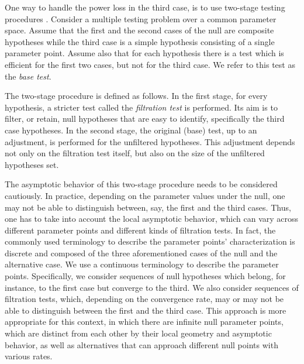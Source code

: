 \documentclass[ejs, twoside]{imsart}
\theoremstyle{plain}
\theoremstyle{remark}
\numberwithin{equation}{section}
\numberwithin{table}{section}
\numberwithin{figure}{section}
\begin{document}

One way to handle the power loss in the third case, is to use two-stage testing procedures \citep{ignatiadis_data-driven_2016, djordjilovic_optimal_2020}. Consider a multiple testing problem over a common parameter space. Assume that the first and the second cases of the null are composite hypotheses while the third case is a simple hypothesis consisting of a single parameter point. Assume also that for each hypothesis there is a test which is efficient for the first two cases, but not for the third case. We refer to this test as the \emph{base test}. %

The two-stage procedure is defined as follows. In the first stage, for every hypothesis, a stricter test called the \emph{filtration test} is performed. Its aim is to filter, or retain, null hypotheses that are easy to identify, specifically the third case hypotheses. %
In the second stage, the original (base) test, up to an adjustment, is performed for the unfiltered hypotheses.
This adjustment depends not only on the filtration test itself, but also on the size of the unfiltered hypotheses set.

The asymptotic behavior of this two-stage procedure needs to be considered cautiously. In practice, depending on the parameter values under the null, one may not be able to distinguish between, say, the first and the third cases. Thus, one has to take into account the local asymptotic behavior, which can vary across different parameter points and different kinds of filtration tests. In fact, the commonly used terminology to describe the parameter points' characterization is discrete and composed of the three aforementioned cases of the null and the alternative case. We use a continuous terminology to describe the parameter points. Specifically, we consider sequences of null hypotheses which belong, for instance, to the first case but converge to the third. We also consider sequences of filtration tests, which, depending on the convergence rate, may or may not be able to distinguish between the first and the third case. %
This approach is more appropriate for this context, in which there are infinite null parameter points, which are distinct from each other by their local geometry and asymptotic behavior, as well as alternatives that can approach different null points with various rates.
\end{document}

